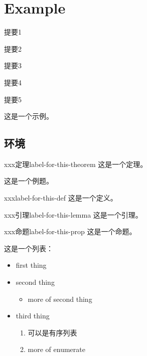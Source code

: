 \chapter{Example}

\begin{introduction}
	\item 提要1
	\item 提要2
	\item 提要3
	\item 提要4
	\item 提要5
\end{introduction}

这是一个示例。

\section{环境}

\begin{theorem}{xxx定理}{label-for-this-theorem}
	这是一个定理。
\end{theorem}

\begin{example}
	这是一个例题。
\end{example}

\begin{definition}{xxx}{label-for-this-def}
	这是一个定义。
\end{definition}

\begin{lemma}{xxx引理}{label-for-this-lemma}
	这是一个引理。
\end{lemma}

\begin{proposition}{xxx命题}{label-for-this-prop}
	这是一个命题。
\end{proposition}

这是一个列表：

\begin{itemize}
	\item first thing
	\item second thing
	      \begin{itemize}
		      \item more of second thing
	      \end{itemize}
	\item third thing
	      \begin{enumerate}
		      \item 可以是有序列表
		      \item more of enumerate
	      \end{enumerate}
\end{itemize}

